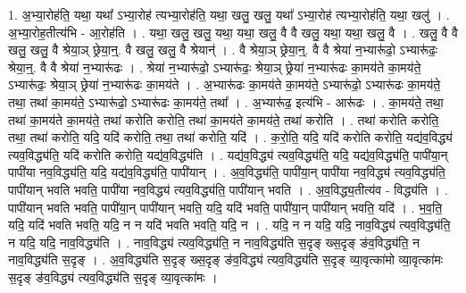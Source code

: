\documentclass[17pt]{extarticle}
\begin{document}
1. अ॒भ्या॒रोह॑ति॒ यथा॒ यथा᳚ ऽभ्या॒रोह॑ त्यभ्या॒रोह॑ति॒ यथा॒ खलु॒ खलु॒ यथा᳚ ऽभ्या॒रोह॑ त्यभ्या॒रोह॑ति॒ यथा॒ खलु॑ । . अ॒भ्या॒रोह॒तीत्य॑भि - आ॒रोह॑ति । . यथा॒ खलु॒ खलु॒ यथा॒ यथा॒ खलु॒ वै वै खलु॒ यथा॒ यथा॒ खलु॒ वै । . खलु॒ वै वै खलु॒ खलु॒ वै श्रेया॒ञ् छ्रेया॒न्॒. वै खलु॒ खलु॒ वै श्रेयान्॑ । . वै श्रेया॒ञ् छ्रेया॒न्॒. वै वै श्रेया॑ न॒भ्यारू॑ढो॒ ऽभ्यारू॑ढः॒ श्रेया॒न्॒. वै वै श्रेया॑ न॒भ्यारू॑ढः । . श्रेया॑ न॒भ्यारू॑ढो॒ ऽभ्यारू॑ढः॒ श्रेया॒ञ् छ्रेया॑ न॒भ्यारू॑ढः का॒मय॑ते का॒मय॑ते॒ ऽभ्यारू॑ढः॒ श्रेया॒ञ् छ्रेया॑ न॒भ्यारू॑ढः का॒मय॑ते । . अ॒भ्यारू॑ढः का॒मय॑ते का॒मय॑ते॒ ऽभ्यारू॑ढो॒ ऽभ्यारू॑ढः का॒मय॑ते॒ तथा॒ तथा॑ का॒मय॑ते॒ ऽभ्यारू॑ढो॒ ऽभ्यारू॑ढः का॒मय॑ते॒ तथा᳚ । . अ॒भ्यारू॑ढ॒ इत्य॑भि - आरू॑ढः । . का॒मय॑ते॒ तथा॒ तथा॑ का॒मय॑ते का॒मय॑ते॒ तथा॑ करोति करोति॒ तथा॑ का॒मय॑ते का॒मय॑ते॒ तथा॑ करोति । . तथा॑ करोति करोति॒ तथा॒ तथा॑ करोति॒ यदि॒ यदि॑ करोति॒ तथा॒ तथा॑ करोति॒ यदि॑ । . क॒रो॒ति॒ यदि॒ यदि॑ करोति करोति॒ यद्य॑व॒विद्ध्य॑ त्यव॒विद्ध्य॑ति॒ यदि॑ करोति करोति॒ यद्य॑व॒विद्ध्य॑ति । . यद्य॑व॒विद्ध्य॑ त्यव॒विद्ध्य॑ति॒ यदि॒ यद्य॑व॒विद्ध्य॑ति॒ पापी॑या॒न् पापी॑या नव॒विद्ध्य॑ति॒ यदि॒ यद्य॑व॒विद्ध्य॑ति॒ पापी॑यान् । . अ॒व॒विद्ध्य॑ति॒ पापी॑या॒न् पापी॑या नव॒विद्ध्य॑ त्यव॒विद्ध्य॑ति॒ पापी॑यान् भवति भवति॒ पापी॑या नव॒विद्ध्य॑ त्यव॒विद्ध्य॑ति॒ पापी॑यान् भवति । . अ॒व॒विद्ध्य॒तीत्य॑व - विद्ध्य॑ति । . पापी॑यान् भवति भवति॒ पापी॑या॒न् पापी॑यान् भवति॒ यदि॒ यदि॑ भवति॒ पापी॑या॒न् पापी॑यान् भवति॒ यदि॑ । . भ॒व॒ति॒ यदि॒ यदि॑ भवति भवति॒ यदि॒ न न यदि॑ भवति भवति॒ यदि॒ न । . यदि॒ न न यदि॒ यदि॒ नाव॒विद्ध्य॑ त्यव॒विद्ध्य॑ति॒ न यदि॒ यदि॒ नाव॒विद्ध्य॑ति । . नाव॒विद्ध्य॑ त्यव॒विद्ध्य॑ति॒ न नाव॒विद्ध्य॑ति स॒दृङ् ख्स॒दृङ् ङ॑व॒विद्ध्य॑ति॒ न नाव॒विद्ध्य॑ति स॒दृङ् । . अ॒व॒विद्ध्य॑ति स॒दृङ् ख्स॒दृङ् ङ॑व॒विद्ध्य॑ त्यव॒विद्ध्य॑ति स॒दृङ् व्या॒वृत्का॑मो व्या॒वृत्का॑मः स॒दृङ् ङ॑व॒विद्ध्य॑ त्यव॒विद्ध्य॑ति स॒दृङ् व्या॒वृत्का॑मः । \newline
\end{document}
